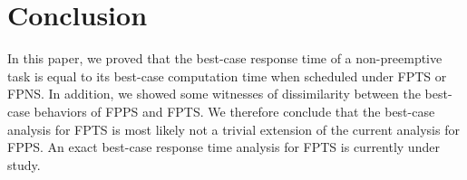 \documentclass[conference,compsoc]{IEEEtran}
\newcommand{\br}    {\mbox{\it BR}}
\begin{document}




\section{Conclusion}
In this paper, we proved that the best-case response time of a non-preemptive task is equal to its best-case computation time when scheduled under FPTS or FPNS. In addition, we showed some witnesses of dissimilarity between the best-case behaviors of FPPS and FPTS. We therefore conclude that the best-case analysis for FPTS is most likely not a trivial extension of the current analysis for FPPS. An exact best-case response time analysis for FPTS is currently under study.


%
%
%
%
\end{document}
